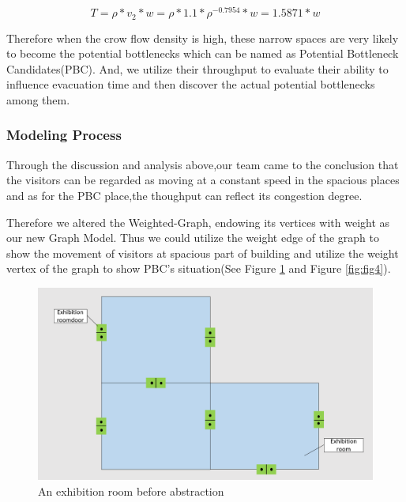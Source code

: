 \documentclass[12pt]{article}
\begin{document}
\begin{equation}
    T=\rho*v_{2}*w=\rho*1.1*\rho^{-0.7954}*w=1.5871*w 
\end{equation}

Therefore when the crow flow density is high, these narrow spaces are very likely to become the potential bottlenecks which can be named as Potential Bottleneck Candidates(PBC). And, we utilize their throughput to evaluate their ability to influence evacuation time and then discover the actual potential bottlenecks among them.

\subsubsection{Modeling Process}

Through the discussion and analysis above,our team came to the conclusion that 
the visitors can be regarded as moving at a constant speed in the spacious places and as for the PBC place,the thoughput can reflect its congestion degree.

Therefore we altered the Weighted-Graph, endowing its vertices with  
weight as our new Graph Model. Thus we could utilize the weight edge of the graph to show the movement 
of visitors at spacious part of building and utilize the weight vertex of the graph to show PBC's situation(See Figure \ref{fig:fig3} and Figure \ref{fig:fig4}).

\begin{figure}[htb] 
	\centering
	\includegraphics[scale=0.23]{figure4.png}
	\caption{An exhibition room before abstraction}
	\label{fig:fig3}
\end{figure}
\end{document}
